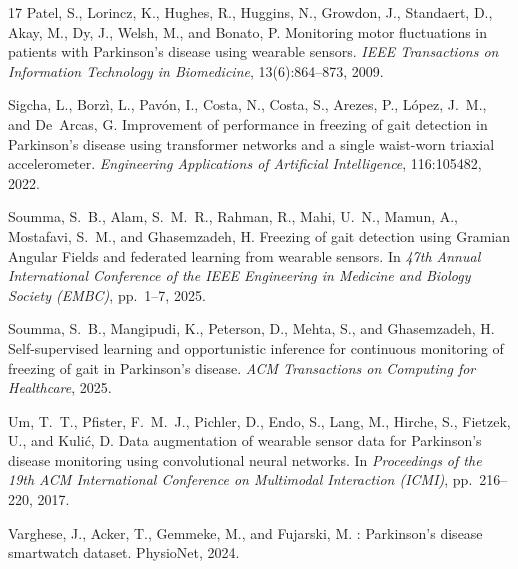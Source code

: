 \documentclass[pmlr]{jmlr}
\begin{document}
\begin{thebibliography}{17}
Patel, S., Lorincz, K., Hughes, R., Huggins, N., Growdon, J., Standaert, D.,
  Akay, M., Dy, J., Welsh, M., and Bonato, P.
\newblock Monitoring motor fluctuations in patients with {Parkinson's} disease
  using wearable sensors.
\newblock \emph{IEEE Transactions on Information Technology in Biomedicine},
  13(6):864--873, 2009.

Sigcha, L., Borz{\`{i}}, L., Pav{\'o}n, I., Costa, N., Costa, S., Arezes, P.,
  L{\'o}pez, J.~M., and De~Arcas, G.
\newblock Improvement of performance in freezing of gait detection in
  {Parkinson's} disease using transformer networks and a single waist-worn
  triaxial accelerometer.
\newblock \emph{Engineering Applications of Artificial Intelligence},
  116:105482, 2022.

Soumma, S.~B., Alam, S.~M.~R., Rahman, R., Mahi, U.~N., Mamun, A.,
  Mostafavi, S.~M., and Ghasemzadeh, H.
\newblock Freezing of gait detection using {Gramian Angular Fields} and
  federated learning from wearable sensors.
\newblock In \emph{47th Annual International Conference of the IEEE Engineering
  in Medicine and Biology Society (EMBC)}, pp.\  1--7, 2025{}.

Soumma, S.~B., Mangipudi, K., Peterson, D., Mehta, S., and Ghasemzadeh, H.
\newblock Self-supervised learning and opportunistic inference for continuous
  monitoring of freezing of gait in {Parkinson's} disease.
\newblock \emph{ACM Transactions on Computing for Healthcare}, 2025{}.

Um, T.~T., Pfister, F.~M.~J., Pichler, D., Endo, S., Lang, M., Hirche, S.,
  Fietzek, U., and Kuli{\'c}, D.
\newblock Data augmentation of wearable sensor data for {Parkinson's} disease
  monitoring using convolutional neural networks.
\newblock In \emph{Proceedings of the 19th ACM International Conference on
  Multimodal Interaction (ICMI)}, pp.\  216--220, 2017.

Varghese, J., Acker, T., Gemmeke, M., and Fujarski, M.
: {Parkinson's} disease smartwatch dataset.
\newblock PhysioNet, 2024.


\end{thebibliography}
\end{document}
